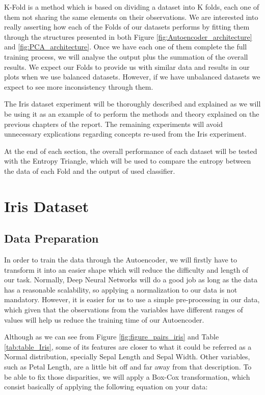 K-Fold is a method which is based on dividing a dataset into K folds, each one of them not sharing the same elements on their observations. We are interested into really asserting how each of the Folds of our datasets performs by fitting them through the structures presented in both Figure \ref{fig:Autoencoder_architecture} and \ref{fig:PCA_architecture}. Once we have each one of them complete the full training process, we will analyse the output plus the summation of the overall results. We expect our Folds to provide us with similar data and results in our plots when we use balanced datasets. However, if we have unbalanced datasets we expect to see more inconsistency through them.\par

The Iris dataset experiment will be thoroughly described and explained as we will be using it as an example of to perform the methods and theory explained on the previous chapters of the report. The remaining experiments will avoid unnecessary explications regarding concepts re-used from the Iris experiment.\par

At the end of each section, the overall performance of each dataset will be tested with the Entropy Triangle, which will be used to compare the entropy between the data of each Fold and the output of used classifier.

\section{Iris Dataset}
\subsection{Data Preparation}

In order to train the data through the Autoencoder, we will firstly have to transform it into an easier shape which will reduce the difficulty and length of our task. Normally, Deep Neural Networks will do a good job as long as the data has a reasonable scalability, so applying a normalization to our data is not mandatory. However, it is easier for us to use a simple pre-processing in our data, which given that the observations from the variables have different ranges of values will help us reduce the training time of our Autoencoder.

Although as we can see from Figure \ref{fig:figure_pairs_iris} and Table \ref{tab:table_Iris}, some of its features are closer to what it could be referred as a Normal distribution, specially Sepal Length and Sepal Width. Other variables, such as Petal Length, are a little bit off and far away from that description. To be able to fix those disparities, we will apply a Box-Cox transformation, which consist basically of applying the following equation on your data:

